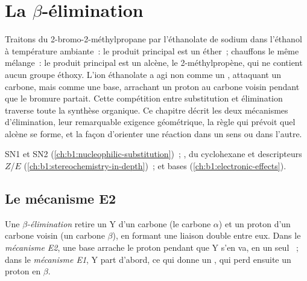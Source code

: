 \chapter{La \texorpdfstring{$\beta$}{Beta}-élimination}\label{ch:b1:elimination}

Traitons du 2-bromo-2-méthylpropane par l'éthanolate de sodium dans
l'éthanol à température ambiante~: le produit principal est un éther~;
chauffons le même mélange~: le produit principal est un alcène, le
2-méthylpropène, qui ne contient aucun groupe éthoxy. L'ion éthanolate a
agi non comme un , attaquant un carbone, mais comme une base,
arrachant un proton au carbone voisin pendant que le bromure partait.
Cette compétition entre substitution et élimination traverse toute la
synthèse organique. Ce chapitre décrit les deux mécanismes
d'élimination, leur remarquable exigence géométrique, la règle qui
prévoit quel alcène se forme, et la façon d'orienter une réaction dans
un sens ou dans l'autre.

\begin{recall}
SN1 et SN2 (\cref{ch:b1:nucleophilic-substitution})~; ,  du cyclohexane et descripteurs $Z$/$E$
(\cref{ch:b1:stereochemistry-in-depth})~;  et bases
(\cref{ch:b1:electronic-effects}).
\end{recall}

\section{Le mécanisme E2}

\begin{definition}\label{def:b1:elimination:elimination}
Une \emph{$\beta$-élimination} retire un  Y
d'un carbone (le carbone $\alpha$) et un proton d'un carbone voisin (un
carbone $\beta$), en formant une liaison double entre eux. Dans le
\emph{mécanisme E2}, une base arrache le proton pendant que Y
s'en va, en un seul ~; dans le \emph{mécanisme
E1}, Y part d'abord, ce qui donne un , qui perd
ensuite un proton en $\beta$.
\end{definition}

